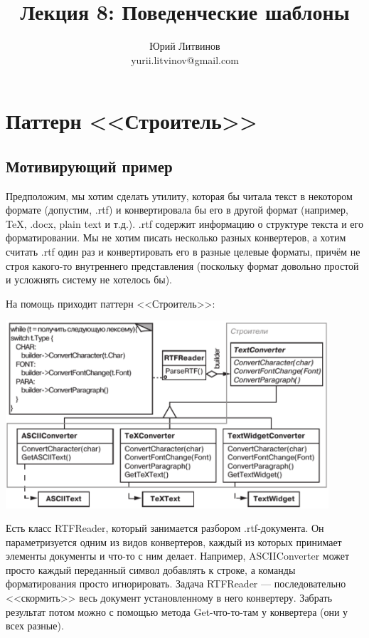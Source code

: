 \documentclass[a5paper]{article}
\title{Лекция 8: Поведенческие шаблоны}
\author{Юрий Литвинов\\\small{yurii.litvinov@gmail.com}}
\date{}
\begin{document}
\maketitle
\thispagestyle{empty}

\section{Паттерн <<Строитель>>}

\subsection{Мотивирующий пример}

Предположим, мы хотим сделать утилиту, которая бы читала текст в некотором формате (допустим, .rtf) и конвертировала бы его в другой формат (например, TeX, .docx, plain text и т.д.). .rtf содержит информацию о структуре текста и его форматировании. Мы не хотим писать несколько разных конвертеров, а хотим считать .rtf один раз и конвертировать его в разные целевые форматы, причём не строя какого-то внутреннего представления (поскольку формат довольно простой и усложнять систему не хотелось бы).

На помощь приходит паттерн <<Строитель>>:

\begin{center}
    \includegraphics[width=0.9\textwidth]{textConverter.png}
\end{center}

Есть класс RTFReader, который занимается разбором .rtf-документа. Он параметризуется одним из видов конвертеров, каждый из которых принимает элементы документы и что-то с ним делает. Например, ASCIIConverter может просто каждый переданный символ добавлять к строке, а команды форматирования просто игнорировать. Задача RTFReader --- последовательно <<скормить>> весь документ установленному в него конвертеру. Забрать результат потом можно с помощью метода Get-что-то-там у конвертера (они у всех разные).
\end{document}
